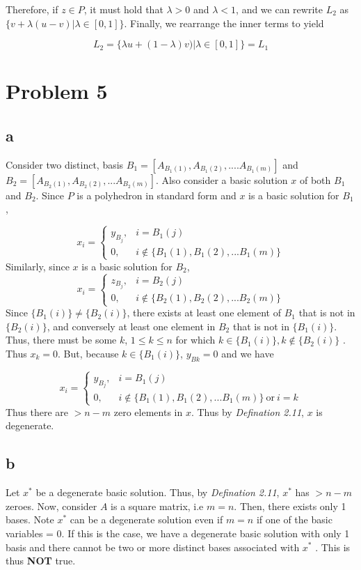 \documentclass[11pt]{article}
\begin{document}
Therefore, if $z\in P$, it must hold that $\lambda>0$ and $\lambda < 1$, and we can rewrite $L_2$ as $\{v+\lambda(u-v)|\lambda\in[0,1]\}$. Finally, we rearrange the inner terms to yield

$$
L_2=\{\lambda u+(1-\lambda)v)|\lambda\in[0,1]\}=L_1
$$

\section*{Problem 5}
\subsection*{a}
Consider two distinct, basis $B_1 = [A_{B_1(1)},A_{B_1(2)},....A_{B_1(m)}]$ and $B_2 = [A_{B_2(1)},A_{B_2(2)},...A_{B_2(m)}]$. Also consider a basic solution $x$ of both $B_1$ and $B_2$. Since $P$ is a polyhedron in standard form and $x$ is a basic solution for $B_1$, 

\[
    x_i = 
    \begin{cases}
        y_{B_j}, & i = B_1(j)\\
        0,              & i\notin \{B_1(1), B_1(2),...B_1(m)\}
    \end{cases}
\]
Similarly, since $x$ is a basic solution for $B_2$,
\[
    x_i = 
    \begin{cases}
        z_{B_j}, & i = B_2(j)\\
        0,              & i\notin \{B_2(1), B_2(2),...B_2(m)\}
    \end{cases}
\]
Since $\{ B_1(i)\} \ne \{B_2(i)\}$, there exists at least one element of $B_1$ that is not in $\{B_2(i)\}$, and conversely at least one element in $B_2$ that is not in $\{B_1(i)\}$. Thus, there must be some $k$, $1 \le k \le n$ for which $k \in \{B_1(i)\}, k \notin \{B_2(i)\}$ . Thus $x_k = 0$. But, because $k \in \{B_1(i)\}$, $y_{Bk} = 0$ and we have

\[
    x_i = 
    \begin{cases}
        y_{B_j}, & i = B_1(j)\\
        0,              & i\notin \{B_1(1), B_1(2),...B_1(m)\}\ \text{or}\ i = k
    \end{cases}
\]
Thus there are $> n-m$ zero elements in $x$. Thus by \textit{Defination 2.11}, $x$ is degenerate.

\subsection*{b}
Let $x^*$ be a degenerate basic solution. Thus, by \textit{Defination 2.11}, $x^*$ has $> n-m$ zeroes. Now, consider $A$ is a square matrix, i.e $m = n$. Then, there exists only 1 bases. Note $x^*$ can be a degenerate solution even if $m=n$ if one of the basic variables = 0. If this is the case, we have a degenerate basic solution with only 1 basis and there cannot be two or more distinct bases associated with $x^*$ . This is thus \textbf{NOT} true.
\end{document}
